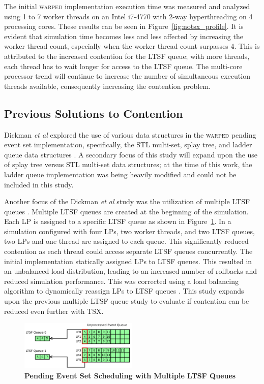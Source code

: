 \documentclass{sig-alternate}
\begin{document}
The initial \textsc{warped} implementation execution time was measured and analyzed using
1 to 7 worker threads on an Intel i7-4770 with 2-way hyperthreading on 4 processing cores.
These results can be seen in Figure~\ref{fig:notsx_profile}.  It is evident that
simulation time becomes less and less affected by increasing the worker thread count,
especially when the worker thread count surpasses 4.  This is attributed to the increased
contention for the LTSF queue; with more threads, each thread has to wait longer for
access to the LTSF queue.  The multi-core processor trend will continue to increase the
number of simultaneous execution threads available, consequently increasing the contention
problem.

\subsection{Previous Solutions to Contention}

Dickman \emph{et al} explored the use of various data structures in the \textsc{warped}
pending event set implementation, specifically, the STL multi-set, splay tree, and ladder
queue data structures \cite{dickman}.  A secondary focus of this study will expand upon
the use of splay tree versus STL multi-set data structures; at the time of this work, the
ladder queue implementation was being heavily modified and could not be included in this
study.

Another focus of the Dickman \emph{et al} study was the utilization of multiple LTSF
queues \cite{dickman}.  Multiple LTSF queues are created at the beginning of the
simulation.  Each LP is assigned to a specific LTSF queue as shown in
Figure~\ref{fig:multipleLTSF}.  In a simulation configured with four LPs, two worker
threads, and two LTSF queues, two LPs and one thread are assigned to each queue.  This
significantly reduced contention as each thread could access separate LTSF queues
concurrently.  The initial implementation statically assigned LPs to LTSF queues.  This
resulted in an unbalanced load distribution, leading to an increased number of rollbacks
and reduced simulation performance.  This was corrected using a load balancing algorithm
to dynamically reassign LPs to LTSF queues \cite{dickman}.  This study expands upon the
previous multiple LTSF queue study to evaluate if contention can be reduced even further
with TSX.

\begin{figure}
    \centering
    \graphicspath{ {./figures/} }
    \includegraphics[width=0.5\textwidth,keepaspectratio]{multiple_ltsf}
    \caption{\textbf{Pending Event Set Scheduling with Multiple LTSF
        Queues}}\label{fig:multipleLTSF}
\end{figure}
\end{document}
